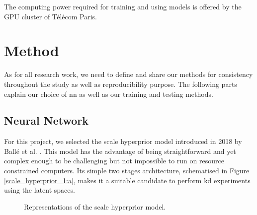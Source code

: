 The computing power required for training and using models is offered by the GPU cluster of Télécom Paris.

\section{Method}
As for all research work, we need to define and share our methods for consistency throughout the study as well as reproducibility purpose. The following parts explain our choice of \acrshort{nn} as well as our training and testing methods.

\subsection{Neural Network}
For this project, we selected the scale hyperprior model introduced in 2018 by Ballé et al. \cite{ballé2018variationalimagecompressionscale}. This model has the advantage of being straightforward and yet complex enough to be challenging but not impossible to run on resource constrained computers. Its simple two stages architecture, schematised in Figure \ref{scale_hyperprior_1:a}, makes it a suitable candidate to perform \acrshort{kd} experiments using the latent spaces.

\begin{figure}[H]
    \centering
    \qquad
    \caption[Representations of the scale hyperprior model.]{Representations of the scale hyperprior model.}
    \label{kd_lic_2}
\end{figure}

